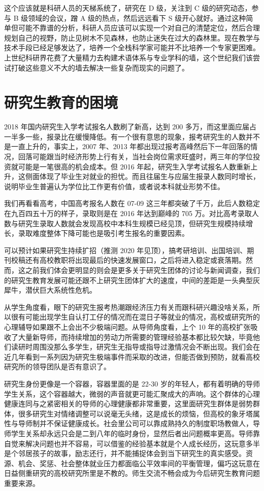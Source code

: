 \documentclass[]{tufte-book}
\begin{document}
这个应该就是科研人员的天梯系统了，研究在 D 级，关注到 C 级的研究动态，参与 B 级领域的会议，蹭 A 级的热点，然后远远看下 S 级开心就好。通过这种简单但可能不靠谱的分析，科研人员应该可以实现一个对自己的清楚定位，然后合理规划自己的视野，防止见树木不见森林，也防止迷失在过大的森林里。现在教学与技术手段已经足够发达了，培养一个全栈科学家可能并不比培养一个专家更困难。上世纪科研界花费了大量精力去构建术语体系与专业学科的墙，这个世纪我们该尝试打破这些意义不大的墙去解决一些复杂而现实的问题了。

\hypertarget{ux7814ux7a76ux751fux6559ux80b2ux7684ux56f0ux5883}{%
\section{研究生教育的困境}\label{ux7814ux7a76ux751fux6559ux80b2ux7684ux56f0ux5883}}

2018 年国内研究生入学考试报名人数刷了新高，达到 200 多万，而这里面应届占一半多一些，报录比在缓慢降低。有一个很有意思的现象，报考研究生的人数并不是一直上升的，事实上，2007 年、2013 年都出现过报考高峰然后下一年回落的情况，回落可能跟当时经济形势上行有关，当社会岗位需求旺盛时，两三年的学位投资就可能是一笔很高的机会成本。但 2016 年起，研究生入学考试报名人数重新上升，这侧面体现了毕业生对就业的担忧。而且往届生与应届生报录人数同时增长，说明毕业生普遍认为学位比工作更有价值，或者说本科就业形势不佳。

我们再看看高考，中国高考报名人数在 07-09 这三年都突破了千万，此后人数稳定在九百四五十万的样子，录取则是在 2016 年达到巅峰的 705 万。对比高考录取人数与研究生录取人数就会发现高校中本科生规模已经见顶，但研究生规模持续增长，录取难度整体下降可能也是吸引考生报名的重要因素。

可以预计如果研究生持续扩招（推测 2020 年见顶），搞考研培训、出国培训、期刊校稿还有高校教职将出现最后的快速发展窗口，之后将进入稳定或衰落期。然而，这之前我们体会更明显的则会是更多关于研究生团体的讨论与新闻调查，我们的研究生教育发展可能还跟不上研究生团体扩大的速度，中间的差距是一头典型灰犀牛，潜伏巨大系统性危机。

从学生角度看，眼下的研究生报考热潮跟经济压力有关而跟科研兴趣没啥关系，所以很有可能出现学生自认打工仔的情况而在混日子等就业的情况，高校或研究所的心理辅导如果跟不上会出不少极端问题。从导师角度看，上个 10 年的高校扩张吸收了大量新导师，而持续增加的劳动力所需要的管理经验基本都比较欠缺，毕竟他们读研时周围没那么多学生，研究生无指导或指导过激情况会不断出现。我们会在近几年看到一系列因为研究生极端事件而采取的改进，但能否做到预防，就看高校研究所的领导团队是否有意识了。

研究生身份更像是一个容器，容器里面的是 22-30 岁的年轻人，都有着明确的导师学生关系，这个容器越大，微弱的声音就更可能汇聚成大的声响。这个群体的心理健康连同与之紧密相关的导师的心理健康都非常重要，这里面研究生群体是弱势群体，很多研究生对情绪调整可以说毫无头绪，这是成长的烦恼，但高校的象牙塔属性与导师制并不保证健康成长。社会里公司可以靠成熟持久的制度职场教做人，导师学生关系却永远只会是二到八年的临时身份，显然后者出问题概率更高。导师靠自觉来解决问题也并不容易，可以借鉴的经验基本就是个人成长经历，这玩意多半是个邻居孩子的故事，励志还行，并不能捕捉体会到当下研究生的真实感受。资源、机会、奖惩、社会整体就业压力都面临公平效率间的平衡管理，偏巧这玩意在日益侧重研究的高校研究所里是不教的。师生交流不畅会成为今后研究生教育问题重要来源。
\end{document}
